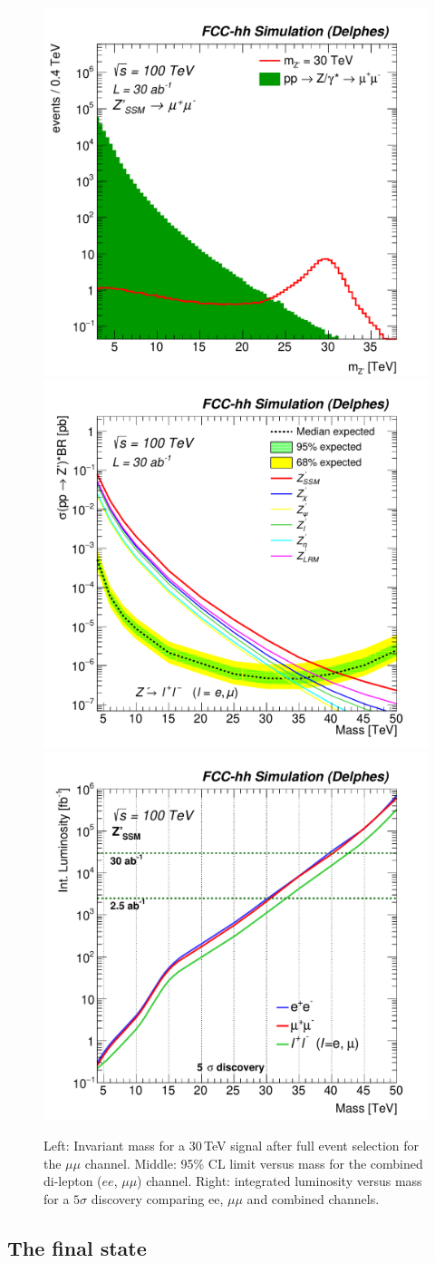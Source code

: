 \documentclass[a4paper,11pt]{article}
\begin{document}
\begin{figure}[!htb]
  \centering
  \includegraphics[width=0.32\columnwidth]{Fig/mzp_sel0_nostack_log_mm-eps-converted-to.pdf}
  \includegraphics[width=0.32\columnwidth]{Fig/lim_Zprime_ll_fcc_v02_allxs-eps-converted-to.pdf}
  \includegraphics[width=0.32\columnwidth]{Fig/DiscoveryPotential_ll_comb_rootStyle-eps-converted-to.pdf}
  \caption{Left: Invariant mass for a 30\,TeV signal after full event selection for the $\mu\mu$ channel. Middle: 95\% CL limit versus mass for the combined di-lepton ($ee$, $\mu\mu$) channel. Right: integrated luminosity versus mass for a $5\sigma$ discovery comparing ee, $\mu\mu$ and combined channels.}
  \label{figure:leptonicresonances:ll}
\end{figure}



\subsection{The \texorpdfstring{\tautau}{tautau} final state}
\label{sec:leptautau}
\end{document}
